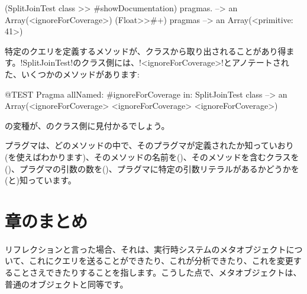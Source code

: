 \documentclass[a4paper,10pt,twoside]{book}
\begin{document}
\begin{code}{}
(SplitJoinTest class >> #showDocumentation) pragmas.
  --> an Array(<ignoreForCoverage>)
(Float>>#+) pragmas --> an Array(<primitive: 41>)
\end{code}

特定のクエリを定義するメソッドが、クラスから取り出されることがあり得ます。\ct!SplitJoinTest!のクラス側には、\ct!<ignoreForCoverage>!とアノテートされた、いくつかのメソッドがあります: %

\begin{code}{@TEST}
Pragma allNamed: #ignoreForCoverage in: SplitJoinTest class  --> an Array(<ignoreForCoverage> <ignoreForCoverage> <ignoreForCoverage>)
\end{code}

の変種が、のクラス側に見付かるでしょう。

プラグマは、どのメソッドの中で、そのプラグマが定義されたか知っていおり(を使えばわかります)、そのメソッドの名前を()、そのメソッドを含むクラスを()、プラグマの引数の数を()、プラグマに特定の引数リテラルがあるかどうかを(と)知っています。 


\section{章のまとめ}

リフレクションと言った場合、それは、実行時システムのメタオブジェクトについて、これにクエリを送ることができたり、これが分析できたり、これを変更することさえできたりすることを指します。こうした点で、メタオブジェクトは、普通のオブジェクトと同等です。
\end{document}

